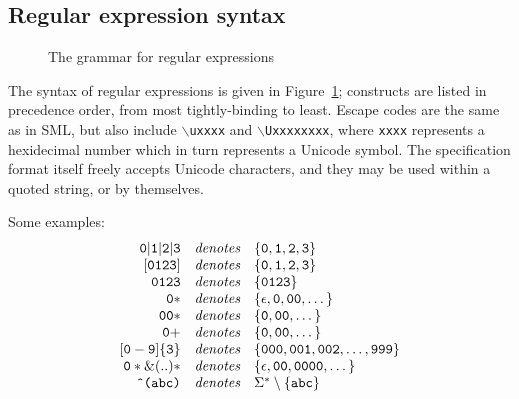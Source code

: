 \subsection{Regular expression syntax}

\begin{figure}
\caption{The \ulex{} grammar for regular expressions}\label{ulex-rule-syntax}
\end{figure}

The syntax of regular expressions is given in Figure~\ref{ulex-rule-syntax}; constructs are listed in precedence order, from most tightly-binding to least.  Escape codes are the same as in SML, but also include \texttt{$\backslash$uxxxx} and \texttt{$\backslash$Uxxxxxxxx}, where \texttt{xxxx} represents a hexidecimal number which in turn represents a Unicode symbol.  The specification format itself freely accepts Unicode characters, and they may be used within a quoted string, or by themselves.

Some examples:
\[
\begin{array}{rcl}
{\tt 0 | 1 | 2 | 3}	& \textit{denotes} &
    \{ \texttt{0}, \texttt{1}, \texttt{2}, \texttt{3} \}	\\
{\tt [0123]}	& \textit{denotes} &
    \{ \texttt{0}, \texttt{1}, \texttt{2}, \texttt{3} \}	\\
{\tt 0123}	& \textit{denotes} &
    \{ \texttt{0123} \}						\\
{\tt 0*}	& \textit{denotes} &
    \{ \epsilon, \texttt{0}, \texttt{00}, \dots \}		\\
{\tt 00*}	& \textit{denotes} &
    \{ \texttt{0}, \texttt{00}, \dots \}		\\
{\tt 0+}	& \textit{denotes} &
    \{ \texttt{0}, \texttt{00}, \dots \}		\\
{\tt [0-9]\{3\}}	& \textit{denotes} &
    \{ \texttt{000}, \texttt{001}, \texttt{002}, \dots, \texttt{999} \}	\\
{\tt 0* \& (..)*}	& \textit{denotes} &
    \{ \epsilon, \texttt{00}, \texttt{0000}, \dots \}	\\
\texttt{\^{ }(abc)}	& \textit{denotes} &
    \Sigma^* \setminus \{ \texttt{abc} \}
\end{array}
\]


